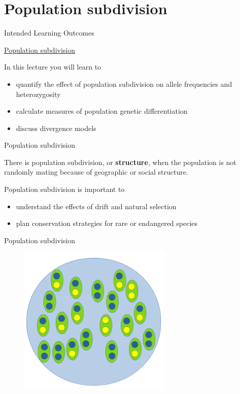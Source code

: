 
\section{Population subdivision}

\begin{frame}{Intended Learning Outcomes}

	\underline{Population subdivision}

	\bigskip

	In this lecture you will learn to
	\begin{itemize}
		\item quantify the effect of population subdivision on allele frequencies and heterozygosity
		\item calculate measures of population genetic differentiation
		\item discuss divergence models
	\end{itemize}

\end{frame}


\begin{frame}{Population subdivision}

	\begin{block}{}
		There is population subdivision, or \textbf{structure}, when the population is not randomly mating
		because of geographic or social structure.
	\end{block}

	\bigskip

	Population subdivision is important to
	\begin{itemize}
		\item understand the effects of drift and natural selection
		\item plan conservation strategies for rare or endangered species
	\end{itemize}

\end{frame}


\begin{frame}{Population subdivision}

        \begin{figure}
                \includegraphics[width=0.65\textwidth]{Pics/predivision}
        \end{figure}

\end{frame}


